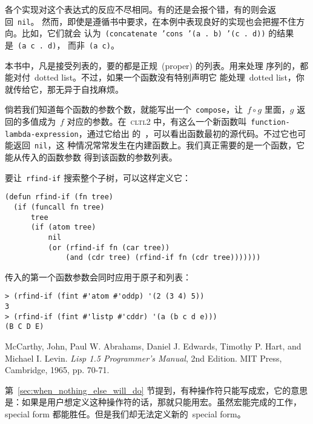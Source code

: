 \begin{notes}
各个实现对这个表达式的反应不尽相同。有的还是会报个错，有的则会返回~\texttt{nil}。
然而，即使是遵循书中要求，在本例中表现良好的实现也会把握不住方向。比如，它们就会
认为~\texttt{(concatenate 'cons '(a . b) '(c . d))} 的结果是~\texttt{(a c . d)}，
而非~\texttt{(a c)}。

本书中，凡是接受列表的\utility，要的都是正规~(proper) 的列表。用来处理
序列的\utility，都能对付~dotted list。不过，如果一个函数没有特别声明它
能处理~dotted list，你就传给它，那无异于自找麻烦。


倘若我们知道每个函数的参数个数，就能写出一个~\texttt{compose}，让~$f
\circ g$ 里面，$g$ 返回的多值成为~$f$ 对应的参数。在~\textsc{cltl2}
中，有这么一个新函数叫~\texttt{function-lambda-expression}，通过它给出
的~\lexpr{}，可以看出函数最初的源代码。不过它也可能返回~\texttt{nil}，这
种情况常常发生在内建函数上。我们真正需要的是一个函数，它能从传入的函数参数
得到该函数的参数列表。


要让~\texttt{rfind-if} 搜索整个子树，可以这样定义它：

\begin{verbatim}
(defun rfind-if (fn tree) 
  (if (funcall fn tree) 
      tree
      (if (atom tree) 
          nil
          (or (rfind-if fn (car tree))
              (and (cdr tree) (rfind-if fn (cdr tree)))))))
\end{verbatim} 

传入的第一个函数参数会同时应用于原子和列表： 

\begin{verbatim}
> (rfind-if (fint #'atom #'oddp) '(2 (3 4) 5))
3
> (rfind-if (fint #'listp #'cddr) '(a (b c d e)))
(B C D E)
\end{verbatim}

  McCarthy, John, Paul W. Abrahams, Daniel J. Edwards, Timothy P. Hart, and Michael I. Levin. \emph{Lisp 1.5 Programmer's Manual}, 2nd Edition. MIT Press, Cambridge, 1965, pp. 70-71.  

  第~\ref{sec:when_nothing_else_will_do} 节提到，有种操作符只能写成宏，它的意思
  是：如果是用户想定义这种操作符的话，那就只能用宏。虽然宏能完成的工作，special form 
  都能胜任。但是我们却无法定义新的~special form。


\end{notes}
